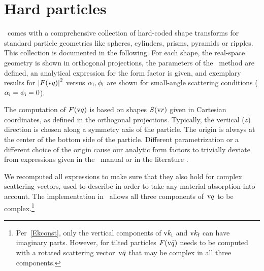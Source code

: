 \section{Hard particles}\label{SHPFF}


\makeatletter
\renewcommand{\@thesubfigure}{\relax}
\makeatother


\def\ffsection#1{%
\subsection{#1}}


\BornAgain\ comes with a comprehensive collection of hard-coded
shape transforms for standard particle geometries like
spheres, cylinders, prisms, pyramids or ripples.
This collection is documented in the following.
For each shape,
the real-space geometry is shown in orthogonal projections,
the parameters of the \BornAgain\ method are defined,
an analytical expression for the form factor is given,
and exemplary results for $\left|F(\q)\right|^2$ versus
$\alpha_\sf,\phi_\sf$ are shown for small-angle scattering conditions
($\alpha_\si=\phi_\si=0$).

The computation of $F(\q)$ is based on
shapes $S(\r)$ given in Cartesian coordinates,
as defined in the orthogonal projections.
Typically, the vertical ($z$) direction is chosen
along a symmetry axis of the particle.
The origin is always at the center of the bottom side of the particle.
Different parametrization or a different choice of the origin
cause our analytic form factors to trivially deviate
from expressions given in the \IsGISAXS\ manual \cite[Sec.~2.3]{Laz08}
or in the literature \cite[Appendix]{ReLL09}.

We recomputed all expressions to make sure
that they also hold for complex scattering vectors,
used to describe in order to take any material absorption into account.
The implementation in \BornAgain\ allows all three components
of~$\q$ to be complex.\footnote
{Per~\cref{Ekconst},
only the vertical components of $\k_\si$ and $\k_\sf$ can have imaginary parts.
However,
for tilted particles
$F(\v{\tilde{q}})$ needs to be computed with
a rotated scattering vector~$\v{\tilde q}$
that may be complex in all three components.}

